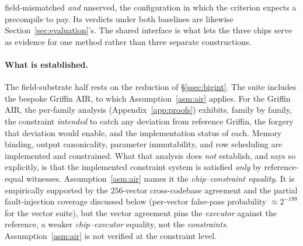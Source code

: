 field-mismatched \emph{and} unserved, the configuration in which the criterion expects a precompile to pay. Its verdicts under both baselines are likewise Section~\ref{sec:evaluation}'s. The shared interface is what lets the three chips serve as evidence for one method rather than three separate constructions.

\paragraph{What is established.}
The field-substrate half rests on the reduction of \S\ref{ssec:bigint}. The suite includes the bespoke Griffin AIR, to which Assumption~\ref{asm:air} applies. For the Griffin AIR, the per-family analysis (Appendix~\ref{app:proofs}) exhibits, family by family, the constraint \emph{intended} to catch any deviation from reference Griffin, the forgery that deviation would enable, and the implementation status of each. Memory binding, output canonicality, parameter immutability, and row scheduling are implemented and constrained. What that analysis does \emph{not} establish, and says so explicitly, is that the implemented constraint system is satisfied \emph{only} by reference-equal witnesses. Assumption~\ref{asm:air} names it the \emph{chip--constraint equality}. It is empirically supported by the $256$-vector cross-codebase agreement and the partial fault-injection coverage discussed below (per-vector false-pass probability $\approx 2^{-199}$ for the vector suite), but the vector agreement pins the \emph{executor} against the reference, a weaker \emph{chip--executor} equality, not the \emph{constraints}. Assumption~\ref{asm:air} is not verified at the constraint level.

